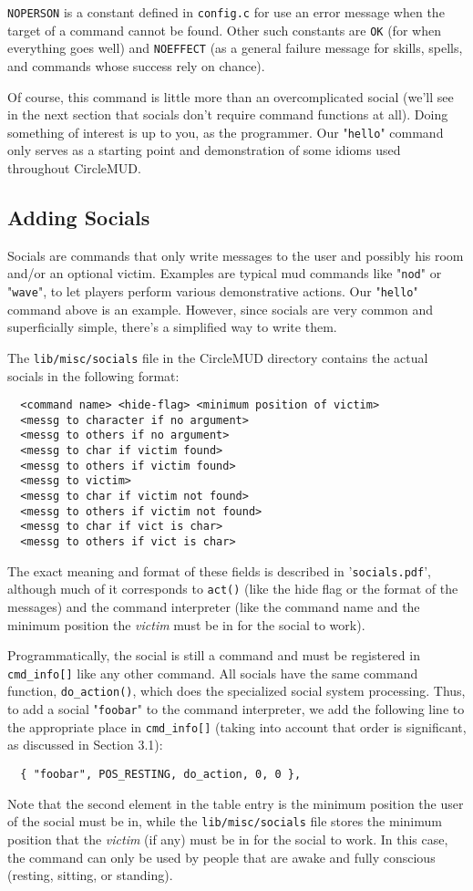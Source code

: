 \documentclass[11pt]{article}
\begin{document}
\texttt{NOPERSON} is a constant defined in \texttt{config.c} for use an error message when the target of a command cannot be found.  Other such constants are \texttt{OK} (for when everything goes well) and \texttt{NOEFFECT} (as a general failure message for skills, spells, and commands whose success rely on chance).
\par
Of course, this command is little more than an overcomplicated social (we'll see in the next section that socials don't require command functions at all).  Doing something of interest is up to you, as the programmer.  Our "\texttt{hello}" command only serves as a starting point and demonstration of some idioms used throughout CircleMUD.

\subsection{Adding Socials}
Socials are commands that only write messages to the user and possibly his room and/or an optional victim.  Examples are typical mud commands like "\texttt{nod}" or "\texttt{wave}", to let players perform various demonstrative actions.  Our "\texttt{hello}" command above is an example.  However, since socials are very common and superficially simple, there's a simplified way to write them.
\par
The \texttt{lib/misc/socials} file in the CircleMUD directory contains the actual socials in the following format:
\begin{verbatim}
  <command name> <hide-flag> <minimum position of victim>
  <messg to character if no argument>
  <messg to others if no argument>
  <messg to char if victim found>
  <messg to others if victim found>
  <messg to victim>
  <messg to char if victim not found>
  <messg to others if victim not found>
  <messg to char if vict is char>
  <messg to others if vict is char>
\end{verbatim}
The exact meaning and format of these fields is described in '\texttt{socials.pdf}', although much of it corresponds to \texttt{act()} (like the hide flag or the format of the messages) and the command interpreter (like the command name and the minimum position the {\em victim} must be in for the social to work).
\par
Programmatically, the social is still a command and must be registered in \texttt{cmd\_info[]} like any other command.  All socials have the same command function, \texttt{do\_action()}, which does the specialized social system processing.  Thus, to add a social "\texttt{foobar}" to the command interpreter, we add the following line to the appropriate place in \texttt{cmd\_info[]} (taking into account that order is significant, as discussed in Section 3.1):
\begin{verbatim}
  { "foobar", POS_RESTING, do_action, 0, 0 },
\end{verbatim}
Note that the second element in the table entry is the minimum position the user of the social must be in, while the \texttt{lib/misc/socials} file stores the minimum position that the {\em victim} (if any) must be in for the social to work.  In this case, the command can only be used by people that are awake and fully conscious (resting, sitting, or standing).
\end{document}
